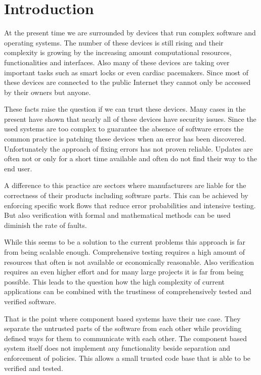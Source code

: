 \documentclass[
a4paper,
12pt,
notitlepage,
parskip=half,
DIV=11,
]{scrbook}
\begin{document}
	
	\tableofcontents
	
	\chapter{Introduction}
	
	At the present time we are surrounded by devices that run complex software and operating systems.
	The number of these devices is still rising and their complexity is growing by the increasing amount computational resources, functionalities and interfaces.
	Also many of these devices are taking over important tasks such as smart locks or even cardiac pacemakers.
	Since most of these devices are connected to the public Internet they cannot only be accessed by their owners but anyone.
	
	These facts raise the question if we can trust these devices.
	Many cases in the present have shown that nearly all of these devices have security issues.
	Since the used systems are too complex to guarantee the absence of software errors the common practice is patching these devices when an error has been discovered.
	Unfortunately the approach of fixing errors has not proven reliable.
	Updates are often not or only for a short time available and often do not find their way to the end user.
	
	A difference to this practice are sectors where manufacturers are liable for the correctness of their products including software parts.
	This can be achieved by enforcing specific work flows that reduce error probabilities and intensive testing.
	But also verification with formal and mathematical methods can be used diminish the rate of faults.
	
	While this seems to be a solution to the current problems this approach is far from being scalable enough.
	Comprehensive testing requires a high amount of resources that often is not available or economically reasonable.
	Also verification requires an even higher effort and for many large projects it is far from being possible.
	This leads to the question how the high complexity of current applications can be combined with the trustiness of comprehensively tested and verified software.
	
	That is the point where component based systems have their use case.
	They separate the untrusted parts of the software from each other while providing defined ways for them to communicate with each other.
	The component based system itself does not implement any functionality beside separation and enforcement of policies.
	This allows a small trusted code base that is able to be verified and tested.
	
\end{document}
